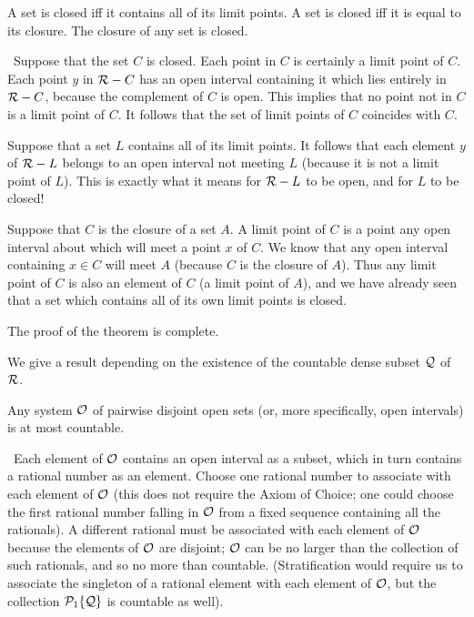\begin{thm}
 A set is closed iff it contains all of its limit
 points.  A set is closed iff it is equal to its closure.  The closure
 of any set is closed.
\end{thm}

\preuve\ Suppose that the set $C$ is closed.  Each point in $C$
is certainly a limit point of $C$.  Each point $y$ in ${\cal R} - C$
has an open interval containing it which lies entirely in ${\cal
R}-C$, because the complement of $C$ is open.  This implies
that no point not in $C$ is a limit point of $C$.  It follows that the set of
limit points of $C$ coincides with $C$.

Suppose that a set $L$ contains all of its limit points.  It follows
that each element $y$ of ${\cal R}-L$ belongs to an open interval not
meeting $L$ (because it is not a limit point of $L$).  This is exactly what it means for ${\cal R}-L$ to be open, and for $L$ to be closed!

Suppose that $C$ is the closure of a set $A$.  A limit point of $C$ is
a point any open interval about which will meet a point $x$ of $C$.
We know that any open interval containing $x \in C$ will meet $A$
(because $C$ is the closure of $A$).  Thus any limit point of $C$ is
also an element of $C$ (a limit point of $A$), and we have already
seen that a set which contains all of its own limit points is closed.

The proof of the theorem is complete.
\finpreuve

We give a result depending on the existence of the countable
dense subset $\cal Q$ of $\cal R$.

\begin{thm}
 Any system $\cal O$ of pairwise disjoint open sets
 (or, more specifically, open intervals) is at most countable.
\end{thm}

\preuve\ Each element of $\cal O$ contains an open interval as a
subset, which in turn contains a rational number as an
element. 
Choose one rational number to associate with each element of $\cal O$
(this does not require the Axiom of Choice; one could
choose the first rational number falling in $\cal O$ from a fixed
sequence containing all the rationals).  A different rational
must be associated with each element of $\cal O$ because the elements of $\cal
O$ are disjoint; $\cal O$ can be no larger than the collection
of such rationals, and so no more than countable.
(Stratification would require us to associate the
singleton of a rational element with each element of 
$\cal O$, but the collection ${\cal P}_1\{{\cal Q}\}$ is countable as
well).
\finpreuve


